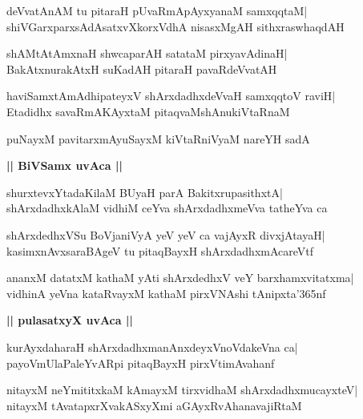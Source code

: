 \documentclass[twoside,12pt,openright]{book}
\newcounter{shloka}[chapter]
\def\uvaca#1{\centerline{{\large\textbf{#1}}}}
\begin{document}
\begin{shloka}%
deVvatAnAM tu pitaraH pUvaRmApAyxyanaM samxqqtaM|\\
shiVGarxparxsAdAsatxvXkorxVdhA nisasxMgAH sithxraswhaqdAH
\end{shloka}

\begin{shloka}%
shAMtAtAmxnaH shwcaparAH satataM pirxyavAdinaH|\\
BakAtxnurakAtxH suKadAH pitaraH pavaRdeVvatAH
\end{shloka}

\begin{shloka}%
haviSamxtAmAdhipateyxV shArxdadhxdeVvaH samxqqtoV raviH|\\
Etadidhx savaRmAKAyxtaM pitaqvaMshAnukiVtaRnaM
\end{shloka}

\begin{shloka}%
puNayxM pavitarxmAyuSayxM kiVtaRniVyaM nareYH sadA
\end{shloka}

\uvaca{|| BiVSamx uvAca ||}
\begin{shloka}%
shurxtevxYtadaKilaM BUyaH parA BakitxrupasithxtA|\\
shArxdadhxkAlaM vidhiM ceYva shArxdadhxmeVva tatheYva ca 
\end{shloka}

\begin{shloka}%
shArxdedhxVSu BoVjaniVyA yeV yeV ca vajAyxR divxjAtayaH|\\
kasimxnAvxsaraBAgeV tu pitaqBayxH shArxdadhxmAcareVtf
\end{shloka}

\begin{shloka}%
ananxM datatxM kathaM yAti shArxdedhxV veY barxhamxvitatxma|\\
vidhinA yeVna kataRvayxM kathaM pirxVNAshi tAnipxta\char'365nf
\end{shloka}

\uvaca{|| pulasatxyX uvAca ||}
\begin{shloka}%
kurAyxdaharaH shArxdadhxmanAnxdeyxVnoVdakeVna ca|\\
payoVmUlaPaleYvARpi pitaqBayxH pirxVtimAvahanf
\end{shloka}

\begin{shloka}%
nitayxM neYmititxkaM kAmayxM tirxvidhaM shArxdadhxmucayxteV|\\
nitayxM tAvatapxrXvakASxyXmi aGAyxRvAhanavajiRtaM
\end{shloka}
\end{document}
